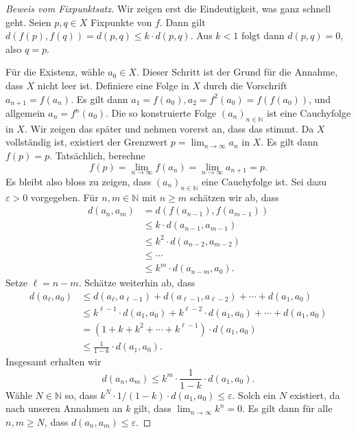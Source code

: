 \documentclass[../main.tex]{subfiles}
\begin{document}
\begin{proof}[Beweis vom Fixpunktsatz]
  Wir zeigen erst die Eindeutigkeit,
  was ganz schnell geht.
  Seien $p, q \in X$ Fixpunkte von $f$.
  Dann gilt $d(f(p), f(q)) = d(p,q) \leq k \cdot d(p, q)$.
  Aus $k < 1$ folgt dann $d(p, q) = 0$,
  also $q = p$.

  Für die Existenz, wähle $a_0 \in X$. Dieser
  Schritt ist der Grund für die Annahme,
  dass $X$ nicht leer ist.
  Definiere eine Folge in $X$ durch die
  Vorschrift $a_{n+1}= f(a_n)$.
  Es gilt dann $a_1 = f(a_0), a_2 = f^2(a_0) = f(f(a_0))$,
  und allgemein $a_n = f^n(a_0)$.
  Die so konstruierte Folge ${(a_{n})}_{n \in \mathbb{N}}$
  ist eine Cauchyfolge in $X$. Wir zeigen das später
  und nehmen vorerst an, dass das stimmt.
  Da $X$ vollständig ist, existiert der Grenzwert
  $p = \lim_{n \to \infty} a_n$ in $X$.
  Es gilt dann $f(p) = p$.
  Tatsächlich, berechne
  \[
  f(p) = \lim_{n \to \infty} f(a_n) = \lim_{n \to \infty}a_{n+1} = p.
  \]
  Es bleibt also bloss zu zeigen,
  dass $ {(a_n)}_{n \in \mathbb{N}}$
  eine Cauchyfolge ist.
  Sei dazu $\varepsilon > 0$ vorgegeben.
  Für $n, m \in \mathbb{N}$ mit $n \geq m$
  schätzen wir ab, dass
  \begin{align*}
    d(a_n, a_m)
    & = d(f(a_{n-1}), f(a_{m-1}))\\
    & \leq k \cdot d(a_{n-1}, a_{m-1}) \\
    &\leq k^2 \cdot d(a_{n-2}, a_{m-2})\\
    &\leq \cdots \\
    &\leq k^m \cdot d(a_{n-m}, a_0).
  \end{align*}
  Setze $\ell = n -m $.
  Schätze weiterhin ab, dass
  \begin{align*}
    d(a_{\ell}, a_0)
    &\leq d(a_\ell, a_{\ell - 1})
    + d(a_{\ell - 1}, a_{\ell-2}) + \cdots + d(a_1, a_0)\\
    &\leq k^{\ell-1} \cdot d(a_{1}, a_{0})
    + k^{\ell - 2} \cdot d(a_1, a_0)
    + \cdots
    + d(a_1, a_0) \\
    &= (1 + k + k^2 + \cdots + k^{\ell-1})
    \cdot d(a_1, a_0) \\
    &\leq \frac{1}{1-k} \cdot d(a_1, a_0).
  \end{align*}
  Insgesamt erhalten wir
  \[
    d(a_n, a_m) \leq k^m \cdot \frac{1}{1-k} \cdot d(a_1, a_0).
  \]
  Wähle $N \in \mathbb{N}$ so,
  dass $k^N \cdot 1/(1-k) \cdot d(a_1, a_0) \leq \varepsilon$.
  Solch ein $N$ existiert, da
  nach unseren Annahmen an $k$ gilt,
  dass $\lim_{n \to \infty} k^n = 0$.
  Es gilt dann für alle $n, m \geq N$, dass
  $d(a_n, a_m) \leq \varepsilon$.
\end{proof}
\end{document}
